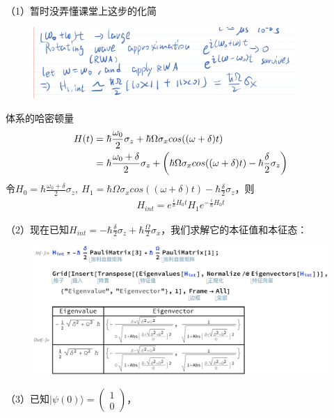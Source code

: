 \documentclass[UTF8,12pt]{article} %
\makeatletter
\newenvironment{proof}[1][\protect\proofname]{\par
\normalfont\topsep6\p@\@plus6\p@\relax
\trivlist
\itemindent\parindent
\item[\hskip\labelsep
\scshape
#1]\ignorespaces
}{%
\endtrivlist\@endpefalse
}
\renewcommand{\proofname}{\it{Solution}}
\makeatother
\begin{document}
\begin{proof}[解]~\par
（1）暂时没弄懂课堂上这步的化简
\begin{figure}[H]
\begin{center}
\includegraphics[width=10cm]{hint}
\end{center}
\end{figure}
体系的哈密顿量
\begin{align}
H(t) &= \hbar\frac{\omega_0}{2}\sigma_{z} + \hbar\Omega\sigma_{x}cos((\omega+\delta)t) \notag\\
&= \hbar\frac{\omega_0 + \delta}{2}\sigma_{z} + \left(\hbar\Omega\sigma_{x}cos((\omega+\delta)t) - \hbar\frac{\delta}{2}\sigma_z\right)
\end{align}
令$H_0 = \hbar\frac{\omega_0 + \delta}{2}\sigma_{z},~H_1 = \hbar\Omega\sigma_{x}cos((\omega+\delta)t) - \hbar\frac{\delta}{2}\sigma_z$，则
\begin{align}
H_{int} = e^{\frac{i}{\hbar}H_0t} H_1 e^{-\frac{i}{\hbar}H_0t}
\end{align}
\par（2）现在已知$H_{int}=-\hbar\frac{\delta}{2}\sigma_z+\hbar\frac{\Omega}{2}\sigma_x$，我们求解它的本征值和本征态：
\begin{figure}[H]
\begin{center}
\includegraphics[width=14cm]{eigencal}
\end{center}
\end{figure}
（3）已知$|\psi(0)\rangle = \begin{pmatrix}1\\0\end{pmatrix}$，

\end{proof}
\end{document}
